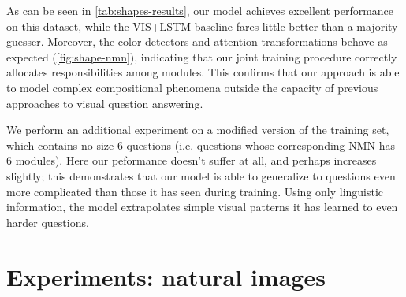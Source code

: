 As can be seen in \autoref{tab:shapes-results}, our model achieves excellent
performance on this dataset, while the VIS+LSTM baseline fares little better
than a majority guesser. Moreover, the color detectors and attention
transformations behave as expected (\autoref{fig:shape-nmn}), indicating that
our joint training procedure correctly allocates responsibilities among modules.
This confirms that our approach is able to model complex compositional phenomena
outside the capacity of previous approaches to visual question answering. 

We perform an additional experiment on a modified version of the training set,
which contains no size-6 questions (i.e. questions whose corresponding NMN has 6
modules). Here our peformance doesn't suffer at all, and perhaps increases
slightly; this demonstrates that our model is able to generalize to questions
even more complicated than those it has seen during training. Using only
linguistic information, the model extrapolates simple visual patterns it has
learned to even harder questions.

\section{Experiments: natural images}

